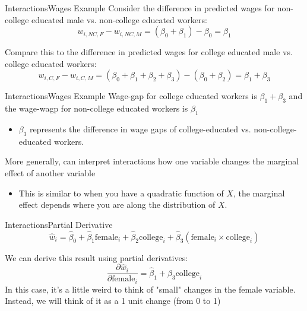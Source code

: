 \documentclass[aspectratio=169,t,11pt,table]{beamer}
\begin{document}
\begin{frame}{Interactions}{Wages Example}
  Consider the difference in predicted wages for non-college educated male vs. non-college educated workers:
  $$
    w_{i, NC,F} - w_{i, NC,M} = (\beta_0 + \beta_1) - \beta_0 = \beta_1
  $$

  \bigskip
  Compare this to the difference in predicted wages for college educated male vs. college educated workers:
  $$
    w_{i, C,F} - w_{i, C,M} = (\beta_0 + \beta_1 + \beta_2 + \beta_3) - (\beta_0 + \beta_2) = \beta_1 + \beta_3
  $$
\end{frame}

\begin{frame}{Interactions}{Wages Example}
  Wage-gap for college educated workers is $\beta_1 + \beta_3$ and the wage-wagp for non-college educated workers is $\beta_1$
  \begin{itemize}
    \item $\beta_3$ represents the difference in wage gaps of college-educated vs. non-college-educated workers.
  \end{itemize}

  \pause
  \bigskip
  More generally, can interpret interactions how one variable changes the marginal effect of another variable
  \begin{itemize}
    \item This is similar to when you have a quadratic function of $X$, the marginal effect depends where you are along the distribution of $X$.
  \end{itemize}
\end{frame}


\begin{frame}{Interactions}{Partial Derivative}
  \vspace{-\bigskipamount}
  $$
    \hat{w}_i = \hat{\beta}_0 + \hat{\beta}_1 \text{female}_i + \hat{\beta}_2 \text{college}_i + \hat{\beta}_3 (\text{female}_i \times \text{college}_i) 
  $$
  
  We can derive this result using partial derivatives:
  $$
    \frac{\partial \hat{w}_i}{\partial \text{female}_i} = 
    \hat{\beta}_1 + \hat{\beta}_3 \text{college}_i
  $$
  \pause
  In this case, it's a little weird to think of "small" changes in the female variable. Instead, we will think of it as a 1 unit change (from 0 to 1)
\end{frame}
\end{document}

